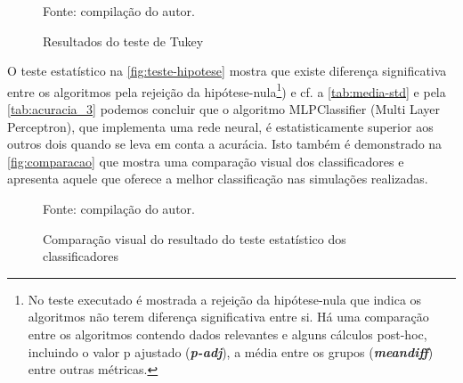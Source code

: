 \begin{figure}[H]
	\centering
	\caption{Resultados do teste de Tukey}
	
	\label{fig:teste-hipotese}
	{\scriptsize Fonte: compilação do autor.}
\end{figure}

O teste estatístico na \autoref{fig:teste-hipotese} mostra que existe diferença significativa entre os algoritmos pela rejeição da hipótese-nula\footnote{No teste executado é mostrada a rejeição da hipótese-nula que indica os algoritmos não terem diferença significativa entre si. Há uma comparação entre os algoritmos contendo dados relevantes e alguns cálculos post-hoc, incluindo o valor p ajustado (\textit{\textbf{p-adj}}), a média entre os grupos (\textit{\textbf{meandiff}}) entre outras métricas.}) e cf. a \autoref{tab:media-std} e pela \autoref{tab:acuracia_3} podemos concluir que o algoritmo MLPClassifier (Multi Layer Perceptron), que implementa uma rede neural, é estatisticamente superior aos outros dois quando se leva em conta a acurácia. Isto também é demonstrado na \autoref{fig:comparacao} que mostra uma comparação visual dos classificadores e apresenta aquele que oferece a melhor classificação nas simulações realizadas.

\begin{figure}[H]
	\centering
	\caption{Comparação visual do resultado do teste estatístico dos classificadores}
	
	\label{fig:comparacao}
	{\scriptsize Fonte: compilação do autor.}
\end{figure}

